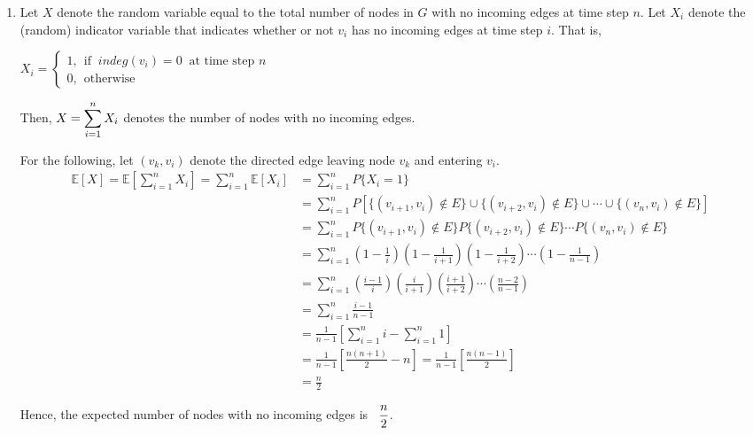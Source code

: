 \documentclass[twoside,11pt]{homework}
\begin{document}
\begin{enumerate}[\bf (a)]
\item Let $X$ denote the random variable equal to the total number of nodes in $G$ with no incoming edges at time step $n$.  Let $X_i$ denote the (random) indicator variable that indicates whether or not $v_i$ has no incoming edges at time step $i$.  That is, 

$X_i = 
\begin{cases}
1  ,  \ \ \textrm{if  } \ indeg(v_i) = 0 \ \textrm{  at time step }  n\\
0 ,  \ \ \textrm{otherwise}
\end{cases}
$

Then,  $\mathlarger{X = \sum_{i = 1}^n X_i}$ denotes the number of nodes with no incoming edges.   %

For the following, let $(v_k, v_i)$ denote the directed edge leaving node $v_k$ and entering $v_i$. 
\begin{align*}
\mathbb{E}\left[ X \right]  = \mathbb{E}\left[ \sum_{i=1}^{n} X_i \right] = \sum_{i=1}^{n} \mathbb{E}\left[X_i\right]  &=  \sum_{i=1}^{n} P\{X_i = 1\}    \\[0.4em]
& =  \sum_{i=1}^{n} P\left[\{ (v_{i+1}, v_i) \notin E \} \cup \{(v_{i+2}, v_i) \notin E \} \cup \cdots \cup \{(v_{n}, v_i) \notin E \}\right] \\[0.4em]
& = \sum_{i=1}^{n} P\{ (v_{i+1}, v_i) \notin E \} P\{ (v_{i+2}, v_i) \notin E \} \cdots P\{ (v_{n}, v_i) \notin E \} \\[0.4em]
& = \sum_{i=1}^{n} \left(1 - \frac{1}{i}\right)\left(1 - \frac{1}{i+1}\right)\left(1 - \frac{1}{i+2}\right) \cdots \left(1 - \frac{1}{n-1}\right) \\[0.4em]
& = \sum_{i=1}^{n} \left(\frac{i-1}{i}\right)\left(\frac{i}{i+1}\right)\left(\frac{i+1}{i+2} \right) \cdots \left(\frac{n-2}{n-1}\right) \\[0.4em]
& = \sum_{i=1}^{n}  \frac{i-1}{n-1} \\[0.5em]
& = \frac{1}{n-1}\left[\sum_{i=1}^{n} i -  \sum_{i=1}^{n} 1 \right] \\[0.5em]
& = \frac{1}{n-1}\left[\frac{n(n+1)}{2} -  n \right] = \frac{1}{n-1}\left[\frac{n(n-1)}{2}\right] \\[0.5em]
& = \frac{n}{2}
\end{align*}

Hence, the expected number of nodes with no incoming edges is \ $\mathlarger{\frac{n}{2}}$.
\end{enumerate}
\end{document}
